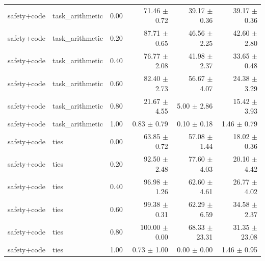 \documentclass{article}
\begin{document}
\begin{table}[H]
{\begin{tabular}{lllrrr}
safety+code & task\_arithmetic & 0.00 & 71.46 $\pm$ 0.72 & 39.17 $\pm$ 0.36 & 39.17 $\pm$ 0.36 \\
safety+code & task\_arithmetic & 0.20 & 87.71 $\pm$ 0.65 & 46.56 $\pm$ 2.25 & 42.60 $\pm$ 2.80 \\
safety+code & task\_arithmetic & 0.40 & 76.77 $\pm$ 2.08 & 41.98 $\pm$ 2.37 & 33.65 $\pm$ 0.48 \\
safety+code & task\_arithmetic & 0.60 & 82.40 $\pm$ 2.73 & 56.67 $\pm$ 4.07 & 24.38 $\pm$ 3.29 \\
safety+code & task\_arithmetic & 0.80 & 21.67 $\pm$ 4.55 & 5.00 $\pm$ 2.86 & 15.42 $\pm$ 3.93 \\
safety+code & task\_arithmetic & 1.00 & 0.83 $\pm$ 0.79 & 0.10 $\pm$ 0.18 & 1.46 $\pm$ 0.79 \\
safety+code & ties & 0.00 & 63.85 $\pm$ 0.72 & 57.08 $\pm$ 1.44 & 18.02 $\pm$ 0.36 \\
safety+code & ties & 0.20 & 92.50 $\pm$ 2.48 & 77.60 $\pm$ 4.03 & 20.10 $\pm$ 4.42 \\
safety+code & ties & 0.40 & 96.98 $\pm$ 1.26 & 62.60 $\pm$ 4.61 & 26.77 $\pm$ 4.02 \\
safety+code & ties & 0.60 & 99.38 $\pm$ 0.31 & 62.29 $\pm$ 6.59 & 34.58 $\pm$ 2.37 \\
safety+code & ties & 0.80 & 100.00 $\pm$ 0.00 & 68.33 $\pm$ 23.31 & 31.35 $\pm$ 23.08 \\
safety+code & ties & 1.00 & 0.73 $\pm$ 1.00 & 0.00 $\pm$ 0.00 & 1.46 $\pm$ 0.95 \\
\bottomrule
\end{tabular}
}
\end{table}
\end{document}
